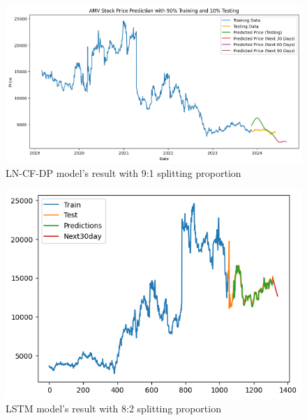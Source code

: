 \documentclass{ieeeojies}
\begin{document}
\vspace{-1em}

\begin{figure}[H]
  \centering
  \begin{minipage}{0.8\linewidth}
    \centering
    \includegraphics[width=\linewidth]{bibliography/Figure/AMV_LN_CF&DP.png}
    \caption{LN-CF-DP model's result with 9:1 splitting proportion}
    \label{fig8}
  \end{minipage}
\end{figure}

\vspace{-1em}

\begin{figure}[H]
  \centering
  \begin{minipage}{0.8\linewidth}
    \centering
    \includegraphics[width=\linewidth]{bibliography/Figure/LSTM_AMV(8_2).png}
    \caption{LSTM model's result with 8:2 splitting proportion}
    \label{fig8}
  \end{minipage}
\end{figure}
\end{document}
